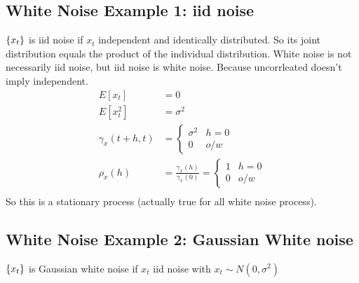 \subsection{White Noise Example 1: iid noise} 
$\{ x_t \}$ is iid noise if $x_t$ independent and identically distributed. So its joint distribution equals the product of the individual distribution. White noise is not necessarily iid noise, but iid noise is white noise. Because uncorrleated doesn't imply independent. 
    \begin{align*}
        E[x_t] & = 0 \\
        E[x_t^2] & = \sigma^2 \\
        \gamma_x(t+h, t) & = 
            \begin{cases}
            \sigma^2 & h=0 \\
            0 & o/w
            \end{cases} \\
        \rho_x(h) &= \frac{\gamma_x(h)}{\gamma_x(0)} = 
            \begin{cases}
            1 & h=0 \\
            0 & o/w
            \end{cases} \\
    \end{align*}
So this is a stationary process (actually true for all white noise process). 

\subsection{White Noise Example 2: Gaussian White noise}
$\{ x_t \}$ is Gaussian white noise if $x_t$ iid noise with $x_t \sim N(0, \sigma^2)$



